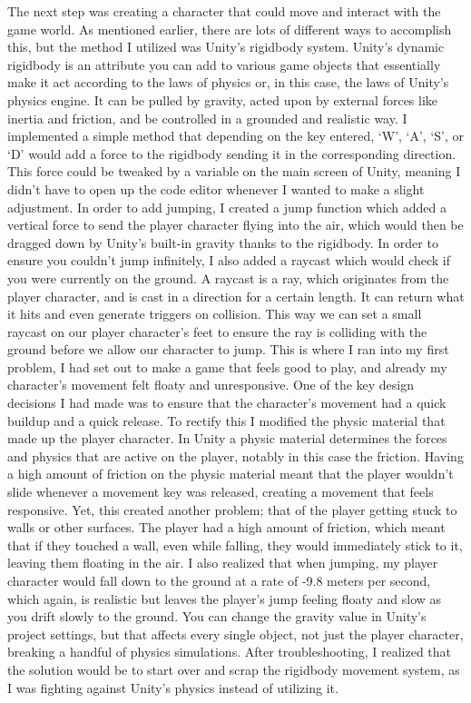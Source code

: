 \documentclass[10pt,twocolumn]{article}
\begin{document}
The next step was creating a character that could move and interact with the game world. As mentioned earlier, there are lots of different ways to accomplish this, but the method I utilized was Unity’s rigidbody system. Unity’s dynamic rigidbody is an attribute you can add to various game objects that essentially make it act according to the laws of physics or, in this case, the laws of Unity’s physics engine. It can be pulled by gravity, acted upon by external forces like inertia and friction, and be controlled in a grounded and realistic way. I implemented a simple method that depending on the key entered, ‘W’, ‘A’, ‘S’, or ‘D’ would add a force to the rigidbody sending it in the corresponding direction. This force could be tweaked by a variable on the main screen of Unity, meaning I didn’t have to open up the code editor whenever I wanted to make a slight adjustment. In order to add jumping, I created a jump function which added a vertical force to send the player character flying into the air, which would then be dragged down by Unity’s built-in gravity thanks to the rigidbody. In order to ensure you couldn’t jump infinitely, I also added a raycast which would check if you were currently on the ground. A raycast is a ray, which originates from the player character, and is cast in a direction for a certain length. It can return what it hits and even generate triggers on collision. This way we can set a small raycast on our player character’s feet to ensure the ray is colliding with the ground before we allow our character to jump. This is where I ran into my first problem, I had set out to make a game that feels good to play, and already my character’s movement felt floaty and unresponsive. One of the key design decisions I had made was to ensure that the character’s movement had a quick buildup and a quick release. To rectify this I modified the physic material that made up the player character. In Unity a physic material determines the forces and physics that are active on the player, notably in this case the friction. Having a high amount of friction on the physic material meant that the player wouldn’t slide whenever a movement key was released, creating a movement that feels responsive. Yet, this created another problem; that of the player getting stuck to walls or other surfaces. The player had a high amount of friction, which meant that if they touched a wall, even while falling, they would immediately stick to it, leaving them floating in the air. I also realized that when jumping, my player character would fall down to the ground at a rate of -9.8 meters per second, which again, is realistic but leaves the player’s jump feeling floaty and slow as you drift slowly to the ground. You can change the gravity value in Unity’s project settings, but that affects every single object, not just the player character, breaking a handful of physics simulations. After troubleshooting, I realized that the solution would be to start over and scrap the rigidbody movement system, as I was fighting against Unity’s physics instead of utilizing it.
\end{document}
